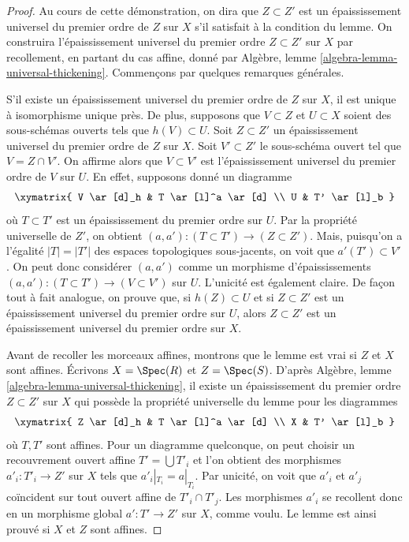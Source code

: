 \begin{proof}
Au cours de cette démonstration, on dira que $Z \subset Z'$ est un épaississement universel du premier
ordre de $Z$ sur $X$ s'il satisfait à la condition du lemme.
On construira l'épaississement universel du premier ordre $Z \subset Z'$ sur $X$
par recollement, en partant du cas affine, donné par
Algèbre, lemme \ref{algebra-lemma-universal-thickening}.
Commençons par quelques remarques générales.

\medskip\noindent
S'il existe un épaississement universel du premier ordre de $Z$ sur $X$, il est unique
à isomorphisme unique près. De plus, supposons que $V \subset Z$ et
$U \subset X$ soient des sous-schémas ouverts tels que $h(V) \subset U$. Soit
$Z \subset Z'$ un épaississement universel du premier ordre de $Z$ sur $X$.
Soit $V' \subset Z'$ le sous-schéma ouvert tel que $V = Z \cap V'$.
On affirme alors que $V \subset V'$ est l'épaississement universel du premier ordre de
$V$ sur $U$. En effet, supposons donné un diagramme
$$
\xymatrix{
V \ar[d]_h & T \ar[l]^a \ar[d] \\
U & T' \ar[l]_b
}
$$
où $T \subset T'$ est un épaississement du premier ordre sur $U$. Par la propriété
universelle de $Z'$, on obtient $(a, a') : (T \subset T') \to (Z \subset Z')$.
Mais, puisqu'on a l'égalité $|T| = |T'|$ des espaces topologiques sous-jacents,
on voit que $a'(T') \subset V'$. On peut donc considérer $(a, a')$
comme un morphisme d'épaississements $(a, a') : (T \subset T') \to (V \subset V')$
sur $U$. L'unicité est également claire. De façon tout à fait analogue, on prouve
que, si $h(Z) \subset U$ et si $Z \subset Z'$ est un épaississement universel du premier
ordre sur $U$, alors $Z \subset Z'$ est un épaississement universel du premier ordre
sur $X$.

\medskip\noindent
Avant de recoller les morceaux affines, montrons que le lemme est vrai si
$Z$ et $X$ sont affines. Écrivons $X = \Spec(R)$ et $Z = \Spec(S)$. D'après
Algèbre, lemme \ref{algebra-lemma-universal-thickening},
il existe un épaississement du premier ordre $Z \subset Z'$ sur $X$
qui possède la propriété universelle du lemme pour les diagrammes
$$
\xymatrix{
Z \ar[d]_h & T \ar[l]^a \ar[d] \\
X & T' \ar[l]_b
}
$$
où $T, T'$ sont affines. Pour un diagramme quelconque, on peut choisir un recouvrement
ouvert affine $T' = \bigcup T'_i$ et l'on obtient des morphismes
$a'_i : T'_i \to Z'$ sur $X$ tels que $a'_i|_{T_i} = a|_{T_i}$.
Par unicité, on voit que $a'_i$ et $a'_j$ coïncident sur tout ouvert affine
de $T'_i \cap T'_j$. Les morphismes $a'_i$ se recollent donc en un morphisme global
$a' : T' \to Z'$ sur $X$, comme voulu. Le lemme est ainsi prouvé si $X$ et $Z$
sont affines.


\end{proof}
